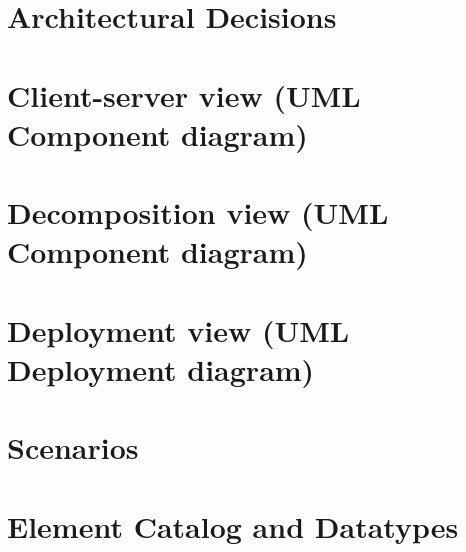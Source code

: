 \documentclass[english]{sareport}
\begin{document}
\maketitle

\tableofcontents
\dominilof
\fakelistoffigures

\chapter{Architectural Decisions}\label{ch:overview}
    
    \clearpage

\chapter{Client-server view (UML Component diagram)}\label{ch:client-server}
    \minilof
    
    \clearpage

\chapter{Decomposition view (UML Component diagram)}\label{ch:decomposition}
    \minilof
    
    \clearpage

\chapter{Deployment view (UML Deployment diagram)}\label{ch:deployment}
    \minilof
    
    \clearpage

\chapter{Scenarios}\label{ch:scenarios}
    \minilof
    

\chapter{Element Catalog and Datatypes}\label{ch:elements-datatypes}

\end{document}
